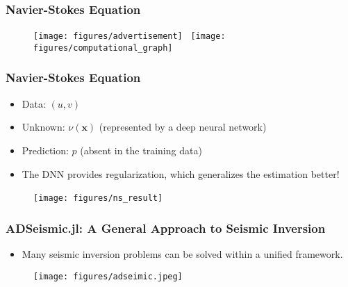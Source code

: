 \documentclass[usenames,dvipsnames]{beamer}
\begin{document}
\begin{frame}
	\frametitle{Navier-Stokes Equation}
	
	\begin{figure}[hbt]
		\centering
		\texttt{[image: figures/advertisement]}~
		\texttt{[image: figures/computational\_graph]}
	\end{figure}
\end{frame}



\begin{frame}
	\frametitle{Navier-Stokes Equation}
	\begin{itemize}
		\item Data: $(u, v)$
		\item Unknown: $\nu(\mathbf{x})$ (represented by a deep neural network)
		\item Prediction: $p$ (absent in the training data) 
		\item The DNN provides regularization, which generalizes the estimation better!
	\end{itemize}
	\begin{figure}[hbt]
		\centering
		\texttt{[image: figures/ns\_result]}~
	\end{figure}
\end{frame}








\begin{frame}
	\frametitle{ADSeismic.jl: A General Approach to Seismic Inversion}
	\begin{itemize}
		\item Many seismic inversion problems can be solved within a unified framework. 
	\end{itemize}
	\begin{figure}[hbt]
		\texttt{[image: figures/adseimic.jpeg]}
	\end{figure}
	
\end{frame}
\end{document}
